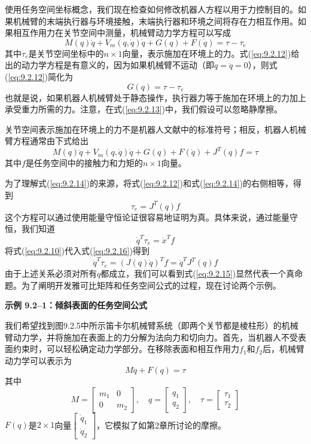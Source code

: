 \documentclass[12pt,a4paper]{ctexart}
\begin{document}
使用任务空间坐标概念，我们现在检查如何修改机器人方程以用于力控制目的。如果机械臂的末端执行器与环境接触，末端执行器和环境之间将存在力相互作用。如果相互作用力在关节空间中测量，机械臂动力学方程可以写成
\begin{equation}\label{eq:9.2.12}
M(q)\ddot{q} + V_m(q, \dot{q})\dot{q} + G(q) + F(\dot{q}) = \tau - \tau_e
\end{equation}
其中$\tau_e$是关节空间坐标中的$n \times 1$向量，表示施加在环境上的力。式(\ref{eq:9.2.12})给出的动力学方程是有意义的，因为如果机械臂不运动（即$\dot{q} = \ddot{q} = 0$），则式(\ref{eq:9.2.12})简化为
\begin{equation}\label{eq:9.2.13}
G(q) = \tau - \tau_e
\end{equation}
也就是说，如果机器人机械臂处于静态操作，执行器力等于施加在环境上的力加上承受重力所需的力。注意，在式(\ref{eq:9.2.13})中，我们假设可以忽略静摩擦。

关节空间表示施加在环境上的力不是机器人文献中的标准符号；相反，机器人机械臂方程通常由下式给出
\begin{equation}\label{eq:9.2.14}
M(q)\ddot{q} + V_m(q, \dot{q})\dot{q} + G(q) + F(\dot{q}) + J^T(q)f = \tau
\end{equation}
其中$f$是任务空间中的接触力和力矩的$n \times 1$向量。

为了理解式(\ref{eq:9.2.14})的来源，将式(\ref{eq:9.2.12})和式(\ref{eq:9.2.14})的右侧相等，得到
\begin{equation}\label{eq:9.2.15}
\tau_e = J^T(q)f
\end{equation}
这个方程可以通过使用能量守恒论证很容易地证明为真。具体来说，通过能量守恒，我们知道
\begin{equation}\label{eq:9.2.16}
\dot{q}^T \tau_e = \dot{x}^T f
\end{equation}
将式(\ref{eq:9.2.10})代入式(\ref{eq:9.2.16})得到
\[
\dot{q}^T \tau_e = (J(q)\dot{q})^T f = \dot{q}^T J^T(q)f
\]
由于上述关系必须对所有$q$都成立，我们可以看到式(\ref{eq:9.2.15})显然代表一个真命题。为了阐明开发雅可比矩阵和任务空间公式的过程，现在讨论两个示例。

\textbf{示例 9.2--1：倾斜表面的任务空间公式}

我们希望找到图9.2.5中所示笛卡尔机械臂系统（即两个关节都是棱柱形）的机械臂动力学，并将施加在表面上的力分解为法向力和切向力。首先，当机器人不受表面约束时，可以轻松确定动力学部分。在移除表面和相互作用力$f_1$和$f_2$后，机械臂动力学可以表示为
\begin{equation}
M\ddot{q} + F(q) = \tau
\end{equation}
其中
\[
M = \begin{bmatrix} m_1 & 0 \\ 0 & m_2 \end{bmatrix}, \quad q = \begin{bmatrix} q_1 \\ q_2 \end{bmatrix}, \quad \tau = \begin{bmatrix} \tau_1 \\ \tau_2 \end{bmatrix}
\]
$F(q)$是$2 \times 1$向量$\begin{bmatrix} \dot{q}_1 \\ \dot{q}_2 \end{bmatrix}$，它模拟了如第2章所讨论的摩擦。
\end{document}
